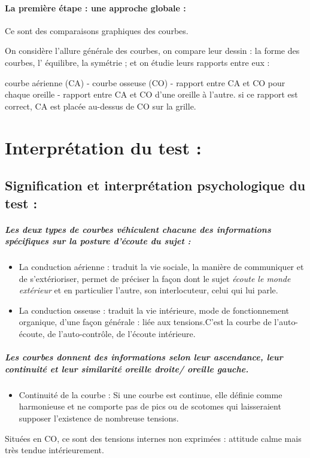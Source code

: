 \paragraph{La première étape : une approche globale : }

Ce sont des comparaisons graphiques des courbes. 

On considère l'allure générale des courbes, on compare leur dessin
: la forme des courbes, l' équilibre, la symétrie ; et on étudie leurs
rapports entre eux : 

courbe aérienne (CA) - courbe osseuse (CO) - rapport entre CA et CO
pour chaque oreille - rapport entre CA et CO d\textquoteright une
oreille à l'autre. si ce rapport est correct, CA est placée au-dessus
de CO sur la grille.
\section{Interprétation du test : }

\subsection{Signification et interprétation psychologique du test : }
\subparagraph{Les deux types de courbes véhiculent chacune des informations spécifiques
sur la posture d'écoute du sujet : }
\begin{itemize}
\item La conduction aérienne : traduit la vie sociale, la manière de communiquer
et de s'extérioriser, permet de préciser la façon dont le sujet\emph{
écoute le monde extérieur} et en particulier l\textquoteright autre,
son interlocuteur, celui qui lui parle. 
\item La conduction osseuse : traduit la vie intérieure, mode de fonctionnement
organique, d'une façon générale : liée aux tensions.C'est la courbe
de l\textquoteright auto-écoute, de l\textquoteright auto-contrôle,
de l'écoute intérieure.
\end{itemize}

\subparagraph{Les courbes donnent des informations selon leur ascendance, leur
continuité et leur similarité oreille droite/ oreille gauche.}
\begin{itemize}
\item Continuité de la courbe : Si une courbe est continue, elle définie
comme harmonieuse et ne comporte pas de pics ou de scotomes qui laisseraient
supposer l'existence de nombreuse tensions.
\end{itemize}
Situées en CO, ce sont des tensions internes non exprimées : attitude
calme mais très tendue intérieurement.

